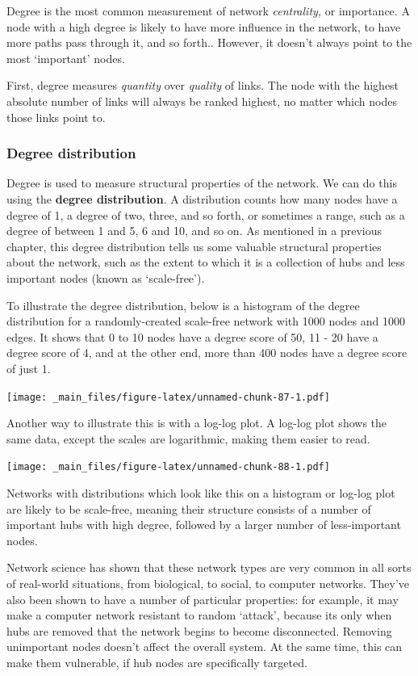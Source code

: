 \documentclass[
]{book}
\begin{document}
Degree is the most common measurement of network \emph{centrality,} or importance. A node with a high degree is likely to have more influence in the network, to have more paths pass through it, and so forth.. However, it doesn't always point to the most `important' nodes.

First, degree measures \emph{quantity} over \emph{quality} of links. The node with the highest absolute number of links will always be ranked highest, no matter which nodes those links point to.

\hypertarget{degree-distribution}{%
\subsubsection{Degree distribution}\label{degree-distribution}}

Degree is used to measure structural properties of the network. We can do this using the \textbf{degree distribution}. A distribution counts how many nodes have a degree of 1, a degree of two, three, and so forth, or sometimes a range, such as a degree of between 1 and 5, 6 and 10, and so on. As mentioned in a previous chapter, this degree distribution tells us some valuable structural properties about the network, such as the extent to which it is a collection of hubs and less important nodes (known as `scale-free').

To illustrate the degree distribution, below is a histogram of the degree distribution for a randomly-created scale-free network with 1000 nodes and 1000 edges. It shows that 0 to 10 nodes have a degree score of 50, 11 - 20 have a degree score of 4, and at the other end, more than 400 nodes have a degree score of just 1.

\texttt{[image: \_main\_files/figure-latex/unnamed-chunk-87-1.pdf]}

Another way to illustrate this is with a log-log plot. A log-log plot shows the same data, except the scales are logarithmic, making them easier to read.

\texttt{[image: \_main\_files/figure-latex/unnamed-chunk-88-1.pdf]}

Networks with distributions which look like this on a histogram or log-log plot are likely to be scale-free, meaning their structure consists of a number of important hubs with high degree, followed by a larger number of less-important nodes.

Network science has shown that these network types are very common in all sorts of real-world situations, from biological, to social, to computer networks. They've also been shown to have a number of particular properties: for example, it may make a computer network resistant to random `attack', because its only when hubs are removed that the network begins to become disconnected. Removing unimportant nodes doesn't affect the overall system. At the same time, this can make them vulnerable, if hub nodes are specifically targeted.
\end{document}
